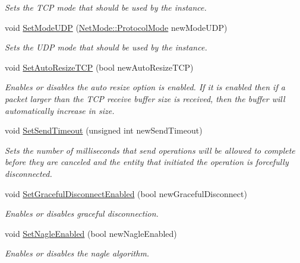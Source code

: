 \begin{DoxyCompactItemize}
\begin{DoxyCompactList}\small\item\em Sets the TCP mode that should be used by the instance. \item\end{DoxyCompactList}\item 
void \hyperlink{class_net_instance_profile_aa0df09d0393d0021f20c9a134a035de1}{SetModeUDP} (\hyperlink{class_net_mode_a43cfa55ee6a4db66a8d7d6c27f766964}{NetMode::ProtocolMode} newModeUDP)
\begin{DoxyCompactList}\small\item\em Sets the UDP mode that should be used by the instance. \item\end{DoxyCompactList}\item 
void \hyperlink{class_net_instance_profile_aa7f2196d4a36a242d2a5e588d19ab8d4}{SetAutoResizeTCP} (bool newAutoResizeTCP)
\begin{DoxyCompactList}\small\item\em Enables or disables the auto resize option is enabled. If it is enabled then if a packet larger than the TCP receive buffer size is received, then the buffer will automatically increase in size. \item\end{DoxyCompactList}\item 
void \hyperlink{class_net_instance_profile_ad9e42f02af634309b946e3ed585afe2e}{SetSendTimeout} (unsigned int newSendTimeout)
\begin{DoxyCompactList}\small\item\em Sets the number of milliseconds that send operations will be allowed to complete before they are canceled and the entity that initiated the operation is forcefully disconnected. \item\end{DoxyCompactList}\item 
void \hyperlink{class_net_instance_profile_af18b9b5d71dcc3eb25a4da7d1ece6d4a}{SetGracefulDisconnectEnabled} (bool newGracefulDisconnect)
\begin{DoxyCompactList}\small\item\em Enables or disables graceful disconnection. \item\end{DoxyCompactList}\item 
void \hyperlink{class_net_instance_profile_ac83c91e34f442dbc25e83d21bbeff8e2}{SetNagleEnabled} (bool newNagleEnabled)
\begin{DoxyCompactList}\small\item\em Enables or disables the nagle algorithm. \item\end{DoxyCompactList}\item 

\end{DoxyCompactItemize}
